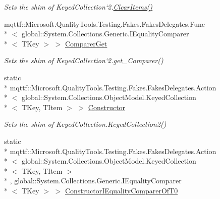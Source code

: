 \begin{DoxyCompactItemize}
\begin{DoxyCompactList}\small\item\em Sets the shim of Keyed\-Collection`2.\hyperlink{class_system_1_1_collections_1_1_object_model_1_1_fakes_1_1_shim_keyed_collection_3_01_t_key_00_01_t_item_01_4_ae47c122bb5dbf14a2db7866c775ede1f}{Clear\-Items()}\end{DoxyCompactList}\item 
mqttf\-::\-Microsoft.\-Quality\-Tools.\-Testing.\-Fakes.\-Fakes\-Delegates.\-Func\\*
$<$ global\-::\-System.\-Collections.\-Generic.\-I\-Equality\-Comparer\\*
$<$ T\-Key $>$ $>$ \hyperlink{class_system_1_1_collections_1_1_object_model_1_1_fakes_1_1_shim_keyed_collection_3_01_t_key_00_01_t_item_01_4_ad685c8f38437ab5bd340dadfeefccfb7}{Comparer\-Get}
\begin{DoxyCompactList}\small\item\em Sets the shim of Keyed\-Collection`2.get\-\_\-\-Comparer()\end{DoxyCompactList}\item 
static \\*
mqttf\-::\-Microsoft.\-Quality\-Tools.\-Testing.\-Fakes.\-Fakes\-Delegates.\-Action\\*
$<$ global\-::\-System.\-Collections.\-Object\-Model.\-Keyed\-Collection\\*
$<$ T\-Key, T\-Item $>$ $>$ \hyperlink{class_system_1_1_collections_1_1_object_model_1_1_fakes_1_1_shim_keyed_collection_3_01_t_key_00_01_t_item_01_4_aab84a973e3999d276ca81c00259643b5}{Constructor}
\begin{DoxyCompactList}\small\item\em Sets the shim of Keyed\-Collection{.\-Keyed\-Collection}2()\end{DoxyCompactList}\item 
static \\*
mqttf\-::\-Microsoft.\-Quality\-Tools.\-Testing.\-Fakes.\-Fakes\-Delegates.\-Action\\*
$<$ global\-::\-System.\-Collections.\-Object\-Model.\-Keyed\-Collection\\*
$<$ T\-Key, T\-Item $>$\\*
, global\-::\-System.\-Collections.\-Generic.\-I\-Equality\-Comparer\\*
$<$ T\-Key $>$ $>$ \hyperlink{class_system_1_1_collections_1_1_object_model_1_1_fakes_1_1_shim_keyed_collection_3_01_t_key_00_01_t_item_01_4_a6f2e05c6dc54f7180fad3598f01db9a1}{Constructor\-I\-Equality\-Comparer\-Of\-T0}

\end{DoxyCompactItemize}
